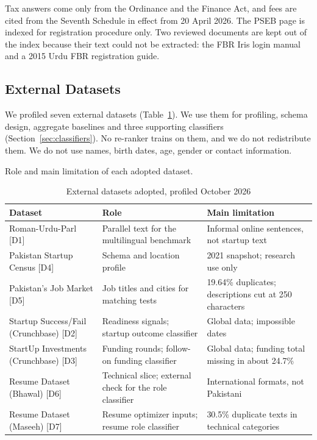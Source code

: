 \documentclass{FastFyp}
\makeatletter
\newcommand{\src}[1]{[#1]}
\newcommand{\capdesc}[1]{%
  \par\nobreak
  \begingroup
  \setstretch{1}%
  \ifdefstring{\@captype}{figure}%
    {\vspace{0.2\baselineskip}}%
    {\vspace{-0.8\baselineskip}}%
  {\centering\normalfont\itshape\small
   \begin{minipage}{0.92\textwidth}\centering #1\end{minipage}\par}%
  \endgroup
  \vspace{0.4\baselineskip}%
}
\makeatother
\begin{document}
Tax answers come only from the Ordinance and the Finance Act, and fees are cited from the Seventh Schedule in effect from 20 April 2026. The PSEB page is indexed for registration procedure only. Two reviewed documents are kept out of the index because their text could not be extracted: the FBR Iris login manual and a 2015 Urdu FBR registration guide.

\subsection{External Datasets}
We profiled seven external datasets (Table~\ref{tab:datasets}). We use them for profiling, schema design, aggregate baselines and three supporting classifiers (Section~\ref{sec:classifiers}). No re-ranker trains on them, and we do not redistribute them. We do not use names, birth dates, age, gender or contact information.

\begin{table}[!ht]
\centering
\caption{External datasets adopted, profiled October 2026}
\capdesc{Role and main limitation of each adopted dataset.}
\begin{tabular}{|p{4.2cm}|p{4.6cm}|p{5.8cm}|}
\hline
\textbf{Dataset} & \textbf{Role} & \textbf{Main limitation} \\
\hline
Roman-Urdu-Parl \src{D1}\cite{ref:alam2022romanurduparl} & Parallel text for the multilingual benchmark & Informal online sentences, not startup text \\
\hline
Pakistan Startup Census \src{D4} & Schema and location profile & 2021 snapshot; research use only \\
\hline
Pakistan's Job Market \src{D5} & Job titles and cities for matching tests & 19.64\% duplicates; descriptions cut at 250 characters \\
\hline
Startup Success/Fail (Crunchbase) \src{D2} & Readiness signals; startup outcome classifier & Global data; impossible dates \\
\hline
StartUp Investments (Crunchbase) \src{D3} & Funding rounds; follow-on funding classifier & Global data; funding total missing in about 24.7\% \\
\hline
Resume Dataset (Bhawal) \src{D6} & Technical slice; external check for the role classifier & International formats, not Pakistani \\
\hline
Resume Dataset (Maseeh) \src{D7} & Resume optimizer inputs; resume role classifier & 30.5\% duplicate texts in technical categories \\
\hline
\end{tabular}
\label{tab:datasets}
\end{table}
\end{document}
